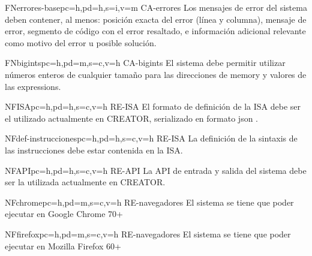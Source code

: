 \begin{softwareReq}{FN}{errores-base}{pc=h,pd=h,s=i,v=m}
    {CA-errores}
    Los mensajes de error del sistema deben contener, al menos: posición exacta
    del error (línea y columna), mensaje de error, segmento de código con el
    error resaltado, e información adicional relevante como motivo del error u
    posible solución.
\end{softwareReq}


\begin{softwareReq}{FN}{bigints}{pc=h,pd=m,s=c,v=h}
    {CA-bigints}
    El sistema debe permitir utilizar números enteros de cualquier tamaño para
    las direcciones de \gls{memory} y valores de las \glspl{expression}.
\end{softwareReq}


\begin{softwareReq}{NF}{ISA}{pc=h,pd=h,s=c,v=h}
    {RE-ISA}
    El formato de definición de la \gls{ISA} debe ser el utilizado
    actualmente en CREATOR, serializado en formato \gls{json}
    \parencite{JSONStandard}.
\end{softwareReq}

\begin{softwareReq}{NF}{def-instrucciones}{pc=h,pd=h,s=c,v=h}
    {RE-ISA}
    La definición de la sintaxis de las instrucciones debe estar contenida en la
    \gls{ISA}.
\end{softwareReq}

\begin{softwareReq}{NF}{API}{pc=h,pd=h,s=c,v=h}
    {RE-API}
    La \gls{API} de entrada y salida del sistema debe ser la utilizada
    actualmente en CREATOR.
\end{softwareReq}

\begin{softwareReq}{NF}{chrome}{pc=h,pd=m,s=c,v=h}
    {RE-navegadores}
    El sistema se tiene que poder ejecutar en Google Chrome 70+
\end{softwareReq}

\begin{softwareReq}{NF}{firefox}{pc=h,pd=m,s=c,v=h}
    {RE-navegadores}
    El sistema se tiene que poder ejecutar en Mozilla Firefox 60+
\end{softwareReq}

